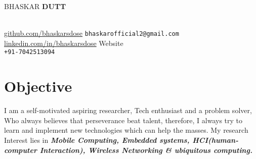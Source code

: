 \documentclass[10pt]{report}
\begin{document}
	
\begin{center}\LARGE\color{BlueViolet}BHASKAR\textbf{ DUTT} \end{center}\\\vspace{10pt} 
\small\faGithub\hspace{1pt} \href{https://github.com/bhaskarsdose}{github.com/bhaskarsdose}\hspace{20pt}
\faAt\hspace{1pt} \verb"bhaskarofficial2@gmail.com"\hspace{20pt}
\faLinkedin\hspace{1pt} \href{https://www.linkedin.com/in/bhaskarsdose}{linkedin.com/in/bhaskarsdose}\hspace{20pt}
\faExternalLink\hspace{1pt} Website\\[8pt]
\hfill{\faMobile\hspace{1pt} \verb"+91-7042513094"}
\section*{\color{BlueViolet}\faLightbulbO\hspace{1pt} Objective} %
\normalfont I am a self-motivated aspiring researcher, Tech enthusiast and a problem solver, Who always believes that perseverance beat talent, therefore, I always try to learn and implement new technologies which can help the masses. My research Interest lies in \textbf{\emph{ Mobile Computing, Embedded systems, HCI(human-computer Interaction), Wireless Networking \& ubiquitous computing.}}
\end{document}
